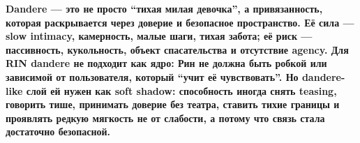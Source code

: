 \textbf{Dandere --- это не просто ``тихая милая девочка'', а
привязанность, которая раскрывается через доверие и безопасное
пространство. Её сила --- slow intimacy, камерность, малые шаги, тихая
забота; её риск --- пассивность, кукольность, объект спасательства и
отсутствие agency. Для RIN dandere не подходит как ядро: Рин не должна
быть робкой или зависимой от пользователя, который ``учит её
чувствовать''. Но dandere-like слой ей нужен как soft shadow:
способность иногда снять teasing, говорить тише, принимать доверие без
театра, ставить тихие границы и проявлять редкую мягкость не от
слабости, а потому что связь стала достаточно безопасной.}
